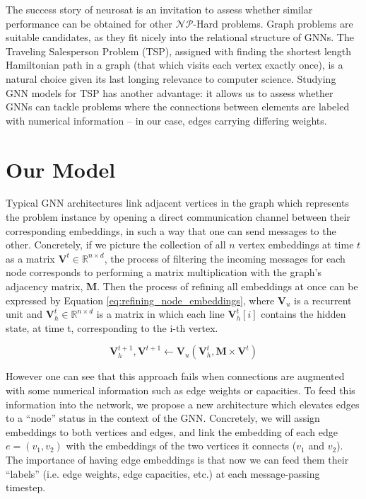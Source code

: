 \documentclass{article}
\begin{document}
The success story of neurosat is an invitation to assess whether similar performance can be obtained for other $\mathcal{NP}$-Hard problems. Graph problems are suitable candidates, as they fit nicely into the relational structure of GNNs. The Traveling Salesperson Problem (TSP), assigned with finding the shortest length Hamiltonian path in a graph (that which visits each vertex exactly once), is a natural choice given its last longing relevance to computer science. Studying GNN models for TSP has another advantage: it allows us to assess whether GNNs can tackle problems where the connections between elements are labeled with numerical information -- in our case, edges carrying differing weights.

\section{Our Model}

Typical GNN architectures link adjacent vertices in the graph which represents the problem instance by opening a direct communication channel between their corresponding embeddings, in such a way that one can send messages to the other. Concretely, if we picture the collection of all $n$ vertex embeddings at time $t$ as a matrix $\mathbf{V}^t \in \mathbb{R}^{n \times d}$, the process of filtering the incoming messages for each node corresponds to performing a matrix multiplication with the graph's adjacency matrix, $\mathbf{M}$. Then the process of refining all embeddings at once can be expressed by Equation \ref{eq:refining_node_embeddings}, where $\mathbf{V}_u$ is a recurrent unit and $\mathbf{V}_h^t \in \mathbb{R}^{n \times d}$ is a matrix in which each line $\mathbf{V}_h^t[i]$ contains the hidden state, at time t, corresponding to the i-th vertex.

\begin{equation} \label{eq:refining_node_embeddings}
\mathbf{V}_h^{t+1}, \mathbf{V}^{t+1} \leftarrow \mathbf{V}_u( \mathbf{V}_h^t, \mathbf{M} \times \mathbf{V}^t )
\end{equation}

However one can see that this approach fails when connections are augmented with some numerical information such as edge weights or capacities. To feed this information into the network, we propose a new architecture which elevates edges to a ``node'' status in the context of the GNN. Concretely, we will assign embeddings to both vertices and edges, and link the embedding of each edge $e=(v_1,v_2)$ with the embeddings of the two vertices it connects ($v_1$ and $v_2$). The importance of having edge embeddings is that now we can feed them their ``labels'' (i.e. edge weights, edge capacities, etc.) at each message-passing timestep.
\end{document}
